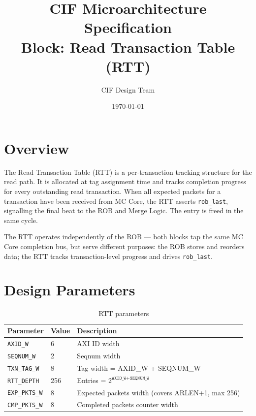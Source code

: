\documentclass[11pt,a4paper]{article}
\title{\textbf{CIF Microarchitecture Specification}\\[0.4em]
\large Block: Read Transaction Table (RTT)}
\author{CIF Design Team}
\date{\today}
\begin{document}
\maketitle
\thispagestyle{fancy}
\tableofcontents
\newpage

\section{Overview}

The Read Transaction Table (RTT) is a per-transaction tracking structure
for the read path. It is allocated at tag assignment time and tracks
completion progress for every outstanding read transaction. When all
expected packets for a transaction have been received from MC Core,
the RTT asserts \texttt{rob\_last}, signalling the final beat to the
ROB and Merge Logic. The entry is freed in the same cycle.

The RTT operates independently of the ROB — both blocks tap the same
MC Core completion bus, but serve different purposes: the ROB stores
and reorders data; the RTT tracks transaction-level progress and drives
\texttt{rob\_last}.

\section{Design Parameters}

\begin{table}[h!]
\centering
\begin{tabular}{lll}
\toprule
\textbf{Parameter} & \textbf{Value} & \textbf{Description} \\
\midrule
\texttt{AXID\_W}         & 6   & AXI ID width \\
\texttt{SEQNUM\_W}       & 2   & Seqnum width \\
\texttt{TXN\_TAG\_W}     & 8   & Tag width = AXID\_W + SEQNUM\_W \\
\texttt{RTT\_DEPTH}      & 256 & Entries = $2^{\texttt{AXID\_W} + \texttt{SEQNUM\_W}}$ \\
\texttt{EXP\_PKTS\_W}    & 8   & Expected packets width (covers ARLEN+1, max 256) \\
\texttt{CMP\_PKTS\_W}    & 8   & Completed packets counter width \\
\bottomrule
\end{tabular}
\caption{RTT parameters}
\end{table}
\end{document}
